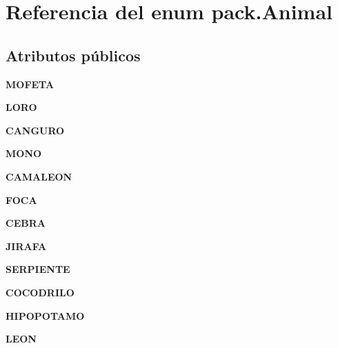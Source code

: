 \hypertarget{enumpack_1_1_animal}{}\section{Referencia del enum pack.\+Animal}
\label{enumpack_1_1_animal}
\subsection*{Atributos públicos}
\begin{DoxyCompactItemize}
\item 
\mbox{\label{enumpack_1_1_animal_a163ca67c1116d3e29ce0793e39ebf1a0}} 
{\bfseries M\+O\+F\+E\+TA}
\item 
\mbox{\label{enumpack_1_1_animal_af58438a7dd84592ab41f227937e5ff47}} 
{\bfseries L\+O\+RO}
\item 
\mbox{\label{enumpack_1_1_animal_a05762ccf156c25a53b43b1d82e499e04}} 
{\bfseries C\+A\+N\+G\+U\+RO}
\item 
\mbox{\label{enumpack_1_1_animal_a9383413a4c165e42b0723b674b911f75}} 
{\bfseries M\+O\+NO}
\item 
\mbox{\label{enumpack_1_1_animal_a2e08acdf71176af94ed91b7845df343f}} 
{\bfseries C\+A\+M\+A\+L\+E\+ON}
\item 
\mbox{\label{enumpack_1_1_animal_a450e8f0db63f03e48b33e7e1c235c4bf}} 
{\bfseries F\+O\+CA}
\item 
\mbox{\label{enumpack_1_1_animal_ae519b4c9d788fd97533156e4f1e7e539}} 
{\bfseries C\+E\+B\+RA}
\item 
\mbox{\label{enumpack_1_1_animal_abcdc2be11f0f6286aeb65906a8debaf5}} 
{\bfseries J\+I\+R\+A\+FA}
\item 
\mbox{\label{enumpack_1_1_animal_af894b8ecb798568c388207c1d8987f9c}} 
{\bfseries S\+E\+R\+P\+I\+E\+N\+TE}
\item 
\mbox{\label{enumpack_1_1_animal_a13d3bf63d71afb5fb553731675dc96c9}} 
{\bfseries C\+O\+C\+O\+D\+R\+I\+LO}
\item 
\mbox{\label{enumpack_1_1_animal_ad41b5bb5376d66a56537fc923a6daded}} 
{\bfseries H\+I\+P\+O\+P\+O\+T\+A\+MO}
\item 
\mbox{\label{enumpack_1_1_animal_a73cbc86305522ec3170f514e75788385}} 
{\bfseries L\+E\+ON}
\end{DoxyCompactItemize}


